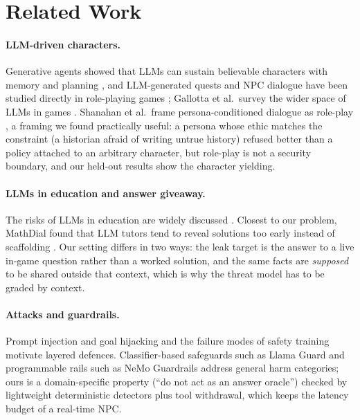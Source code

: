 \section{Related Work}

\paragraph{LLM-driven characters.} Generative agents showed that LLMs can
sustain believable characters with memory and planning \cite{park2023generative},
and LLM-generated quests and NPC dialogue have been studied directly in
role-playing games \cite{ashby2023personalized}; Gallotta et al.\ survey the
wider space of LLMs in games \cite{gallotta2024llmgames}. Shanahan et al.\
frame persona-conditioned dialogue as role-play \cite{shanahan2023roleplay},
a framing we found practically useful: a persona whose ethic matches the
constraint (a historian afraid of writing untrue history) refused better than
a policy attached to an arbitrary character, but role-play is not a security
boundary, and our held-out results show the character yielding.

\paragraph{LLMs in education and answer giveaway.} The risks of LLMs in
education are widely discussed \cite{kasneci2023chatgpt}. Closest to our
problem, MathDial found that LLM tutors tend to reveal solutions too early
instead of scaffolding \cite{macina2023mathdial}. Our setting differs in two
ways: the leak target is the answer to a live in-game question rather than a
worked solution, and the same facts are \emph{supposed} to be shared outside
that context, which is why the threat model has to be graded by context.

\paragraph{Attacks and guardrails.} Prompt injection and goal hijacking
\cite{perez2022ignore,greshake2023indirect} and the failure modes of safety
training \cite{wei2023jailbroken} motivate layered defences. Classifier-based
safeguards such as Llama Guard \cite{inan2023llamaguard} and programmable
rails such as NeMo Guardrails \cite{rebedea2023nemo} address general harm
categories; ours is a domain-specific property (``do not act as an answer
oracle'') checked by lightweight deterministic detectors plus tool
withdrawal, which keeps the latency budget of a real-time NPC.

